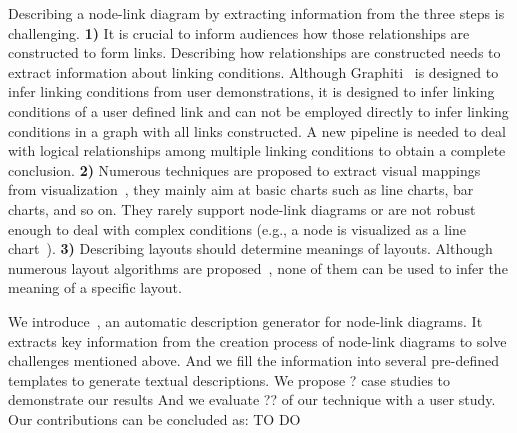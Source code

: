 Describing a node-link diagram by extracting information from the three steps is challenging.
\textbf{1)} 
It is crucial to inform audiences how those relationships are constructed to form links.
Describing how relationships are constructed needs to extract information about linking conditions.
Although Graphiti~\cite{DBLP:journals/tvcg/SrinivasanPEB18} is designed to infer linking conditions from user demonstrations, it is designed to infer linking conditions of a user defined link and can not be employed directly to infer linking conditions in a graph with all links constructed.
A new pipeline is needed to deal with logical relationships among multiple linking conditions to obtain a complete conclusion.
\textbf{2)} %
Numerous techniques are proposed to extract visual mappings from visualization~\cite{DBLP:conf/uist/HarperA14, DBLP:journals/tvcg/HoqueA20, DBLP:journals/corr/abs-2103-00741},  they mainly aim at basic charts such as line charts, bar charts, and so on.
They rarely support node-link diagrams or are not robust enough to deal with complex conditions (e.g., a node is visualized as a line chart~\cite{DBLP:journals/bmcbi/JunkerKS06}).
\textbf{3)} Describing layouts should determine meanings of layouts.
Although numerous layout algorithms are proposed~\cite{hachul2004drawing, DBLP:journals/spe/FruchtermanR91, DBLP:conf/gd/GansnerKN04, DBLP:conf/gd/BrandesP06, DBLP:journals/tvcg/ZhuCHHLZ21}, none of them can be used to infer the meaning of a specific layout.

We introduce~\textit{\ApproachName}, an automatic description generator for node-link diagrams.
It extracts key information from the creation process of node-link diagrams to solve challenges mentioned above.
And we fill the information into several pre-defined templates to generate textual descriptions.
We propose {\color{red}?} case studies to demonstrate our results
{\color{red} And we evaluate ?? of our technique with a user study.}
Our contributions can be concluded as:
\colorbox{text-highlight}{TO DO}

